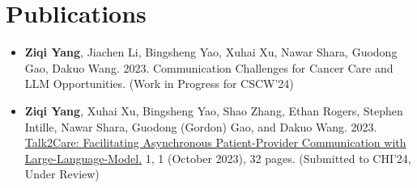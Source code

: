 \section{\textbf{Publications}}
\vspace{1mm}

\begin{justify}\begin{itemize}[leftmargin=3ex, rightmargin=2ex, noitemsep,labelsep=1.2mm,itemsep=1mm, label={$\circ$}]
\item \textbf{Ziqi Yang}, Jiachen Li, Bingsheng Yao, Xuhai Xu, Nawar Shara, Guodong Gao, Dakuo Wang. 2023. Communication Challenges for Cancer Care and LLM Opportunities. (Work in Progress for CSCW'24)
\item \textbf{Ziqi Yang}, Xuhai Xu, Bingsheng Yao, Shao Zhang, Ethan Rogers, Stephen Intille, Nawar Shara, Guodong (Gordon) Gao, and Dakuo Wang. 2023. \href{https://arxiv.org/abs/2309.09357}{Talk2Care: Facilitating Asynchronous Patient-Provider Communication with Large-Language-Model.} 1, 1 (October 2023), 32 pages. (Submitted to CHI'24, Under Review)
\end{itemize}
\end{justify}
    

      \vspace{-5.0mm}